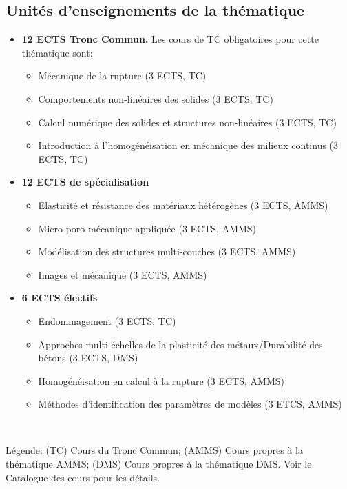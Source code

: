 \documentclass[french,11pt]{article}
\begin{document}
\subsection{Unités d'enseignements de la thématique}
\begin{itemize}
\item
  \textbf{12 ECTS Tronc Commun.} Les cours de TC obligatoires pour cette thématique sont:

  \begin{itemize}
  \item
    Mécanique de la rupture (3 ECTS, TC)
  \item
    Comportements non-linéaires des solides (3 ECTS, TC)
  \item
    Calcul numérique des solides et structures non-linéaires (3 ECTS, TC)
  \item
    Introduction à l’homogénéisation en mécanique des milieux continus (3 ECTS, TC)
  \end{itemize}
\item
  \textbf{12 ECTS de spécialisation}

  \begin{itemize}
  \item
   Elasticité et résistance des matériaux hétérogènes (3 ECTS, AMMS)
  \item
    Micro-poro-mécanique appliquée (3 ECTS, AMMS)
  \item
    Modélisation des structures multi-couches (3 ECTS, AMMS)
  \item
    Images et mécanique (3 ECTS, AMMS)
  \end{itemize}
\item
  \textbf{6 ECTS électifs}

  \begin{itemize}
  \item
    Endommagement (3 ECTS, TC)
  \item
    Approches multi-échelles de la plasticité des métaux/Durabilité des
    bétons (3 ECTS, DMS)
  \item
    Homogénéisation en calcul à la rupture (3 ECTS, AMMS)
  \item
    Méthodes d'identification des paramètres de modèles (3 ETCS, AMMS)
  \end{itemize}
\
\end{itemize}

\noindent Légende: (TC) Cours du Tronc Commun; (AMMS) Cours propres à la thématique AMMS; (DMS) Cours propres à la thématique DMS. Voir le Catalogue des cours pour les détails.
\newpage
\end{document}

